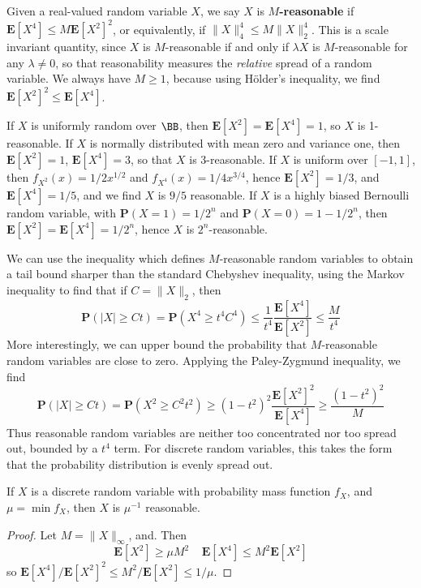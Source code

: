 Given a real-valued random variable $X$, we say $X$ is {\bf $M$-reasonable} if $\mathbf{E}[X^4] \leq M \mathbf{E}[X^2]^2$, or equivalently, if $\| X \|_4^4 \leq M \| X \|_2^4$. This is a scale invariant quantity, since $X$ is $M$-reasonable if and only if $\lambda X$ is $M$-reasonable for any $\lambda \neq 0$, so that reasonability measures the {\it relative} spread of a random variable. We always have $M \geq 1$, because using H\"{o}lder's inequality, we find $\mathbf{E}[X^2]^2 \leq \mathbf{E}[X^4]$.

\begin{example}
    If $X$ is uniformly random over $\BB$, then $\mathbf{E}[X^2] = \mathbf{E}[X^4] = 1$, so $X$ is 1-reasonable. If $X$ is normally distributed with mean zero and variance one, then $\mathbf{E}[X^2] = 1$, $\mathbf{E}[X^4] = 3$, so that $X$ is 3-reasonable. If $X$ is uniform over $[-1,1]$, then $f_{X^2}(x) = 1/2x^{1/2}$ and $f_{X^4}(x) = 1/4x^{3/4}$, hence $\mathbf{E}[X^2] = 1/3$, and $\mathbf{E}[X^4] = 1/5$, and we find $X$ is $9/5$ reasonable. If $X$ is a highly biased Bernoulli random variable, with $\mathbf{P}(X = 1) = 1/2^n$ and $\mathbf{P}(X = 0) = 1 - 1/2^n$, then $\mathbf{E}[X^2] = \mathbf{E}[X^4] = 1/2^n$, hence $X$ is $2^n$-reasonable.
\end{example}

We can use the inequality which defines $M$-reasonable random variables to obtain a tail bound sharper than the standard Chebyshev inequality, using the Markov inequality to find that if $C = \| X \|_2$, then
%
\[ \mathbf{P}(|X| \geq Ct) = \mathbf{P}(X^4 \geq t^4 C^4) \leq \frac{1}{t^4} \frac{\mathbf{E}[X^4]}{\mathbf{E}[X^2]} \leq \frac{M}{t^4} \]
%
More interestingly, we can upper bound the probability that $M$-reasonable random variables are close to zero. Applying the Paley-Zygmund inequality, we find
%
\[ \mathbf{P}(|X| \geq Ct) = \mathbf{P}(X^2 \geq C^2t^2) \geq (1 - t^2)^2 \frac{\mathbf{E}[X^2]^2}{\mathbf{E}[X^4]} \geq \frac{(1 - t^2)^2}{M} \]
%
Thus reasonable random variables are neither too concentrated nor too spread out, bounded by a $t^4$ term. For discrete random variables, this takes the form that the probability distribution is evenly spread out.

\begin{theorem}
    If $X$ is a discrete random variable with probability mass function $f_X$, and $\mu = \min f_X$, then $X$ is $\mu^{-1}$ reasonable.
\end{theorem}
\begin{proof}
    Let $M = \| X \|_\infty$, and. Then
    \[ \mathbf{E}[X^2] \geq \mu M^2 \ \ \ \ \ \mathbf{E}[X^4] \leq M^2 \mathbf{E}[X^2] \]
    so $\mathbf{E}[X^4]/\mathbf{E}[X^2]^2 \leq M^2/\mathbf{E}[X^2] \leq 1/\mu$.
\end{proof}

